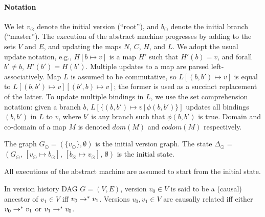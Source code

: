 \paragraph{Notation} We let $v_{\odot}$ denote the initial version
(``root''), and $b_{\odot}$ denote the initial branch (``master'').
The execution of the abstract machine progresses by adding to the sets
$V$ and $E$, and updating the maps $N$, $C$, $H$, and $L$. We adopt
the usual update notation, e.g., $H[b \mapsto v]$ is a map $H'$ such
that $H'(b) = v$, and forall $b' \neq b$, $H'(b') = H(b')$.  Multiple
updates to a map are parsed left-associatively. Map $L$ is assumed to
be commutative, so $L[(b,b') \mapsto v]$ is equal to $L[(b,b') \mapsto
v][(b',b) \mapsto v]$; the former is used as a succinct replacement of
the latter. To update multiple bindings in $L$, we use the set
comprehension notation: given a branch $b$, $L[\{(b,b') \mapsto v
\,|\, \phi(b,b')\}]$ updates all bindings $(b,b')$ in $L$ to $v$,
where $b'$ is any branch such that $\phi(b,b')$ is true. Domain and
co-domain of a map $M$ is denoted $dom(M)$ and $codom(M)$
respectively.

\begin{definition}
  The graph $G_{\odot} = (\{v_{\odot}\},\emptyset)$ is the initial
  version graph. The state $\Delta_{\odot}$ = $(G_{\odot},\,
  [v_{\odot} \mapsto b_{\odot}],\, [b_{\odot} \mapsto v_{\odot}],\,
  \emptyset)$ is the initial state.
\end{definition}

\noindent All executions of the abstract machine are assumed to start from the
initial state.

\begin{definition}[Ancestor]
  \label{def:ancestor}
  In version history DAG $G = (V,E)$, version $v_0 \in V$ is said
  to be a (causal) ancestor of $v_1 \in V$ iff $v_0 \rightarrow^{*} v_1$.
  Versions $v_0, v_1 \in V$ are causally related iff either $v_0
  \rightarrow^{*} v_1$ or $v_1 \rightarrow^{*} v_0$.
\end{definition}


